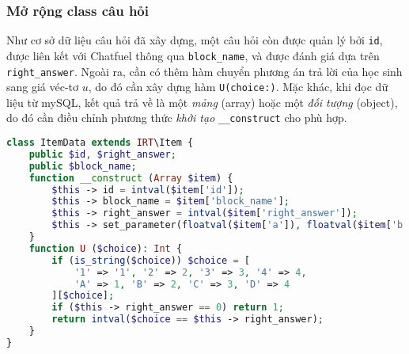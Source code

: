 \subsubsection{Mở rộng class câu hỏi}
Như cơ sở dữ liệu câu hỏi đã xây dựng, một câu hỏi còn được quản lý bởi \texttt{id}, được liên kết với Chatfuel thông qua \texttt{block\_name}, và được đánh giá dựa trên \texttt{right\_answer}. Ngoài ra, cần có thêm hàm chuyển phương án trả lời của học sinh sang giá véc-tơ $u$, do đó cần xây dựng hàm \texttt{U(choice:)}. Mặc khác, khi đọc dữ liệu từ mySQL, kết quả trả về là một \textit{mảng} (array) hoặc một \textit{đối tượng} (object), do đó cần điều chỉnh phương thức \textit{khởi tạo} \texttt{\_\_construct} cho phù hợp.
\begin{lstlisting}[language=php,caption=Class câu hỏi được mở rộng]
class ItemData extends IRT\Item {
	public $id, $right_answer;
	public $block_name;
	function __construct (Array $item) {
		$this -> id = intval($item['id']);
		$this -> block_name = $item['block_name'];
		$this -> right_answer = intval($item['right_answer']);
		$this -> set_parameter(floatval($item['a']), floatval($item['b']));
	}
	function U ($choice): Int {
		if (is_string($choice)) $choice = [
			'1' => '1', '2' => 2, '3' => 3, '4' => 4,
			'A' => 1, 'B' => 2, 'C' => 3, 'D' => 4
		][$choice];
		if ($this -> right_answer == 0) return 1;
		return intval($choice == $this -> right_answer);
	}
}
\end{lstlisting}

